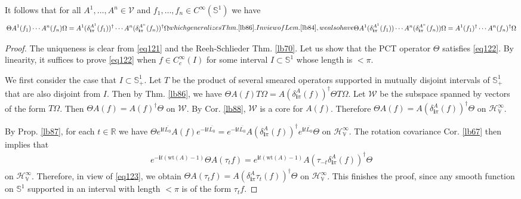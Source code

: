 \documentclass[12pt,b5paper,notitlepage]{article}
\theoremstyle{definition}
\theoremstyle{plain}
\newcommand{\mc}{\mathcal}
\newcommand{\ovl}{\overline}
\newcommand{\im}{\mathbf{i}}
\newcommand{\Rbb}{\mathbb R}
\newcommand{\wt}{\mathrm{wt}}
\newcommand{\Sbb}{{\mathbb S}}
\newcommand{\HV}{\mathcal H_{\mathbb V}}
\newcommand{\MV}{\mathcal V}
\numberwithin{equation}{section}
\begin{document}
It follows that for all $A^1,\dots,A^n\in\MV$ and $f_1,\dots,f_n\in C^\infty(\Sbb^1)$ we have
\begin{subequations}\label{eq121}
\begin{align}
\Theta A^1(f_1)\cdots A^n(f_n)\Omega=A^1(\delta^{A^1}_{\im\pi}(f_1))^\dagger\cdots A^n(\delta^{A^n}_{\im\pi}(f_n))^\dagger\Omega
\end{align}
which generalizes Thm. \ref{lb86}. In view of Lem. \ref{lb84}, we also have
\begin{align}\label{eq121b}
\Theta A^1(\delta^{A^1}_{\im\pi}(f_1))\cdots A^n(\delta^{A^n}_{\im\pi}(f_n))\Omega=A^1(f_1)^\dagger\cdots A^n(f_n)^\dagger\Omega
\end{align}
\end{subequations}

\begin{proof}
The uniqueness is clear from \eqref{eq121} and the Reeh-Schlieder Thm. \ref{lb70}. Let us show that the PCT operator $\Theta$ satisfies \eqref{eq122}. By linearity, it suffices to prove \eqref{eq122} when $f\in C_c^\infty(I)$ for some interval $I\subset\Sbb^1$ whose length is $<\pi$. 

We first consider the case that $I\subset\Sbb^1_+$. Let $T$ be the product of several smeared operators supported in mutually disjoint intervals of $\Sbb^1_+$ that are also disjoint from $I$. Then by Thm. \ref{lb86}, we have $\Theta A(f)T\Omega=A(\delta^A_{\im\pi}(f))^\dagger\Theta T\Omega$. Let $\mc W$ be the subspace spanned by vectors of the form $T\Omega$. Then $\Theta A(f)=A(f)^\dagger\Theta$ on $\mc W$. By Cor. \ref{lb88}, $\mc W$ is a core for $A(f)$. Therefore $\Theta A(f)=A(\delta^A_{\im\pi}(f))^\dagger\Theta$ on $\HV^\infty$.



By Prop. \ref{lb87}, for each $t\in\Rbb$ we have $\Theta e^{\im t\ovl{L_0}}A(f)e^{-\im t\ovl{L_0}}=e^{-\im t\ovl{L_0}}A(\delta^A_{\im\pi}(f))^\dagger e^{\im t\ovl{L_0}}\Theta$ on $\HV^\infty$. The rotation covariance Cor. \ref{lb67} then implies that 
\begin{align*}
e^{-\im t(\wt(A)-1)}\Theta A(\tau_t f)=e^{\im t(\wt(A)-1)}A(\tau_{-t}\delta_{\im\pi}^A(f))^\dagger\Theta
\end{align*}
on $\HV^\infty$. 
Therefore, in view of \eqref{eq123}, we obtain $\Theta A(\tau_tf)=A(\delta^A_{\im\pi}\tau_t(f))^\dagger\Theta$ on $\HV^\infty$. This finishes the proof, since any smooth function on $\Sbb^1$ supported in an interval with length $<\pi$ is of the form $\tau_tf$.
\end{proof}
\end{document}
